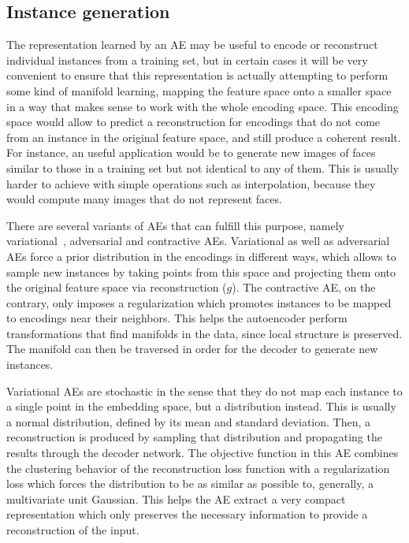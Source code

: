 \subsection{Instance generation}

The representation learned by an AE may be useful to encode or reconstruct individual instances from a training set, but in certain cases it will be very convenient to ensure that this representation is actually attempting to perform some kind of manifold learning, mapping the feature space onto a smaller space in a way that makes sense to work with the whole encoding space. This encoding space would allow to predict a reconstruction for encodings that do not come from an instance in the original feature space, and still produce a coherent result. For instance, an useful application would be to generate new images of faces similar to those in a training set but not identical to any of them. This is usually harder to achieve with simple operations such as interpolation, because they would compute many images that do not represent faces.

There are several variants of AEs that can fulfill this purpose, namely variational~, adversarial and contractive AEs. Variational as well as adversarial AEs force a prior distribution in the encodings in different ways, which allows to sample new instances by taking points from this space and projecting them onto the original feature space via reconstruction ($g$). The contractive AE, on the contrary, only imposes a regularization which promotes instances to be mapped to encodings near their neighbors. This helps the autoencoder perform transformations that find manifolds in the data, since local structure is preserved. The manifold can then be traversed in order for the decoder to generate new instances.

Variational AEs are stochastic in the sense that they do not map each instance to a single point in the embedding space, but a distribution instead. This is usually a normal distribution, defined by its mean and standard deviation. Then, a reconstruction is produced by sampling that distribution and propagating the results through the decoder network. The objective function in this AE combines the clustering behavior of the reconstruction loss function with a regularization loss which forces the distribution to be as similar as possible to, generally, a multivariate unit Gaussian. This helps the AE extract a very compact representation which only preserves the necessary information to provide a reconstruction of the input.

